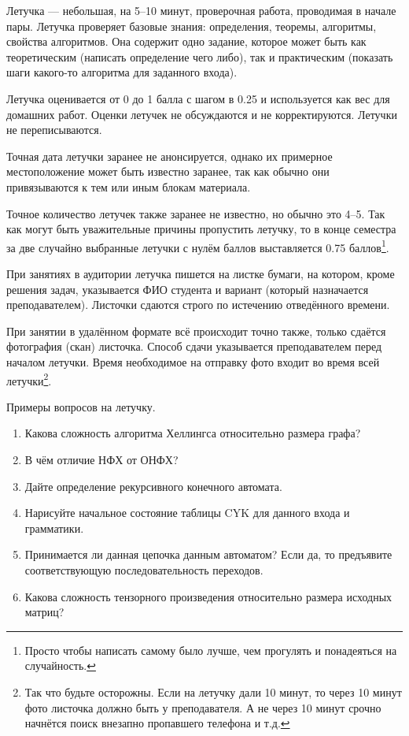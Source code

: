 Летучка --- небольшая, на 5--10 минут, проверочная работа, проводимая в начале пары.
Летучка проверяет базовые знания: определения, теоремы, алгоритмы, свойства алгоритмов.
Она содержит одно задание, которое может быть как теоретическим (написать определение чего либо), так и практическим (показать шаги какого-то алгоритма для заданного входа).

Летучка оценивается от 0 до 1 балла с шагом в 0.25 и используется как вес для домашних работ. Оценки летучек не обсуждаются и не корректируются. Летучки не переписываются.

Точная дата летучки заранее не анонсируется, однако их примерное местоположение может быть известно заранее, так как обычно они привязываются к тем или иным блокам материала.

Точное количество летучек также заранее не известно, но обычно это 4--5. Так как могут быть уважительные причины пропустить летучку, то в конце семестра за две случайно выбранные летучки с нулём баллов выставляется 0.75 баллов\footnote{Просто чтобы написать самому было лучше, чем прогулять и понадеяться на случайность.}.

При занятиях в аудитории летучка пишется на листке бумаги, на котором, кроме решения задач, указывается ФИО студента и вариант (который назначается преподавателем). Листочки сдаются строго по истечению отведённого времени.

При занятии в удалённом формате всё происходит точно также, только сдаётся фотография (скан) листочка. Способ сдачи указывается преподавателем перед началом летучки. Время необходимое на отправку фото входит во время всей летучки\footnote{Так что будьте осторожны. Если на летучку дали 10 минут, то через 10 минут фото листочка должно быть у преподавателя. А не через 10 минут срочно начнётся поиск внезапно пропавшего телефона и т.д.}.

Примеры вопросов на летучку.
\begin{enumerate}
    \item Какова сложность алгоритма Хеллингса относительно размера графа?
    \item В чём отличие НФХ от ОНФХ?
    \item Дайте определение рекурсивного конечного автомата.
    \item Нарисуйте начальное состояние таблицы CYK для данного входа и грамматики.
    \item Принимается ли данная цепочка данным автоматом? Если да, то предъявите соответствующую последовательность переходов.
    \item Какова сложность тензорного произведения относительно размера исходных матриц?
\end{enumerate}
